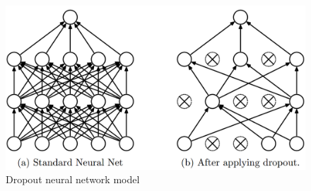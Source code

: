 \begin{figure}
    \centerline{\includegraphics[width=1\columnwidth]{03-neural-networks-in-tumor-detection/figures/dropout.png}}
    \caption{ Dropout neural network model }
    \label{fig:dropout}
\end{figure}